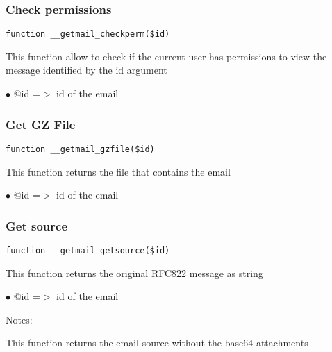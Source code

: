 \documentclass[a4paper]{article}
\begin{document}
\hypertarget{toc75}{}
\subsubsection{Check permissions}

\begin{lstlisting}
function __getmail_checkperm($id)
\end{lstlisting}

This function allow to check if the current user has permissions to view the
message identified by the id argument

\begin{compactitem}
\item[\color{myblue}$\bullet$] @id =$>$ id of the email
\end{compactitem}

\hypertarget{toc76}{}
\subsubsection{Get GZ File}

\begin{lstlisting}
function __getmail_gzfile($id)
\end{lstlisting}

This function returns the file that contains the email

\begin{compactitem}
\item[\color{myblue}$\bullet$] @id =$>$ id of the email
\end{compactitem}

\hypertarget{toc77}{}
\subsubsection{Get source}

\begin{lstlisting}
function __getmail_getsource($id)
\end{lstlisting}

This function returns the original RFC822 message as string

\begin{compactitem}
\item[\color{myblue}$\bullet$] @id =$>$ id of the email
\end{compactitem}

Notes:

This function returns the email source without the base64 attachments
\end{document}
